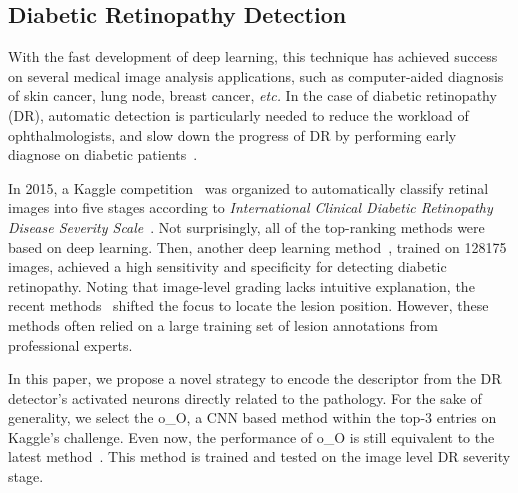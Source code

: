 \documentclass[letterpaper]{article} %
\begin{document}
    \subsection{Diabetic Retinopathy  Detection}
    \label{sec:DR detector}
With the fast development of deep learning, this technique has achieved success on several medical image analysis applications, such as computer-aided diagnosis of skin cancer, lung node, breast cancer, \textit{etc.} In the case of diabetic retinopathy (DR), automatic detection is particularly needed to reduce the workload of ophthalmologists, and slow down the progress of DR by performing early diagnose on diabetic patients~\cite{Gulshan2016jama}.


     In 2015, a Kaggle competition~\cite{kaggle2016diabetic} was organized to automatically classify retinal images into five stages according to \textit{International Clinical Diabetic Retinopathy Disease Severity Scale}~\cite{aao2002drscale}. Not surprisingly, all of the top-ranking methods were based on deep learning. Then, another deep learning method~\cite{Gulshan2016jama}, trained on  128175 images, achieved a high sensitivity and specificity for detecting diabetic retinopathy. Noting that image-level grading lacks intuitive explanation, the recent methods~\cite{Yang17MICCAI,wang2017zoom} shifted the focus to locate the lesion position. However, these methods often relied on a large training set of lesion annotations from professional experts.

     In this paper, we propose a novel strategy to encode the descriptor from the DR detector's activated neurons directly related to the pathology. For the sake of generality, we select the o\_O\cite{oO2016detector}, a CNN based method within the top-3 entries on Kaggle's challenge. Even now, the performance of o\_O is still equivalent to the latest method~\cite{wang2017zoom}. This method is trained and tested on the image level DR severity stage.
\end{document}

